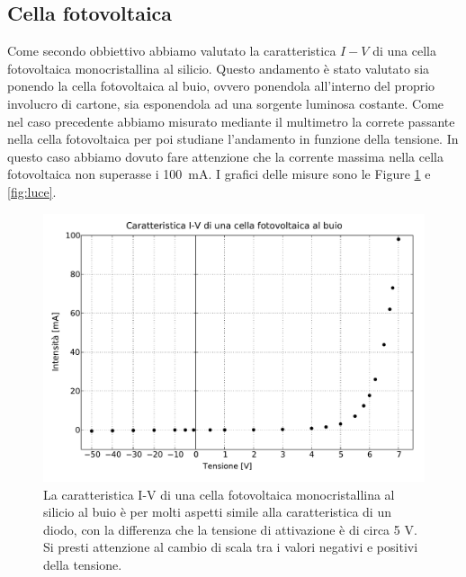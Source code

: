 \subsection*{Cella fotovoltaica}

Come secondo obbiettivo abbiamo valutato la caratteristica $I-V$ di una cella fotovoltaica monocristallina al silicio. Questo andamento è stato valutato sia ponendo la cella fotovoltaica al buio, ovvero ponendola all'interno del proprio involucro di cartone, sia esponendola ad una sorgente luminosa costante.
Come nel caso precedente abbiamo misurato mediante il multimetro la correte passante nella cella fotovoltaica per poi studiane l'andamento in funzione della tensione.
In questo caso abbiamo dovuto fare attenzione che la corrente massima nella cella fotovoltaica non superasse i \SI{100}{\milli\ampere}. I grafici delle misure sono
le Figure \ref{fig:buio} e \ref{fig:luce}.

\begin{figure}
    \includegraphics[scale=0.55]{buio.pdf}
    \caption{La caratteristica I-V di una cella fotovoltaica monocristallina al silicio al buio è per molti aspetti simile alla caratteristica di un diodo, con la differenza che la tensione di attivazione è di circa 5 V. Si presti attenzione al cambio di scala tra i valori negativi e positivi della tensione.}
    \label{fig:buio}
\end{figure}

